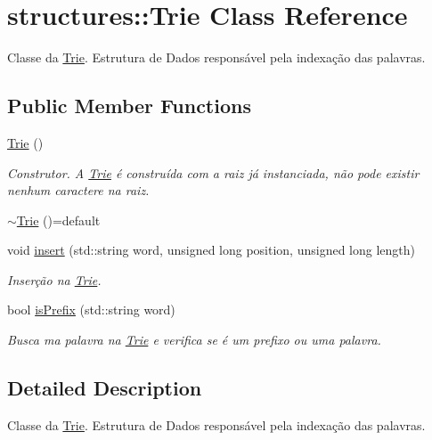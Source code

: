 \hypertarget{classstructures_1_1Trie}{}\section{structures\+:\+:Trie Class Reference}
\label{classstructures_1_1Trie}


Classe da \hyperlink{classstructures_1_1Trie}{Trie}. Estrutura de Dados responsável pela indexação das palavras.  


\subsection*{Public Member Functions}
\begin{DoxyCompactItemize}
\item 
\mbox{\label{classstructures_1_1Trie_af6cf71564b040dfc62bbdedbbab8271a}} 
\hyperlink{classstructures_1_1Trie_af6cf71564b040dfc62bbdedbbab8271a}{Trie} ()
\begin{DoxyCompactList}\small\item\em Construtor. A \hyperlink{classstructures_1_1Trie}{Trie} é construída com a raiz já instanciada, não pode existir nenhum caractere na raiz. \end{DoxyCompactList}\item 
\hyperlink{classstructures_1_1Trie_a02b9941c124c9c6ab85eff56bef7cf77}{$\sim$\+Trie} ()=default
\item 
void \hyperlink{classstructures_1_1Trie_a70ff5a7364c0bb15028578596514cea4}{insert} (std\+::string word, unsigned long position, unsigned long length)
\begin{DoxyCompactList}\small\item\em Inserção na \hyperlink{classstructures_1_1Trie}{Trie}. \end{DoxyCompactList}\item 
bool \hyperlink{classstructures_1_1Trie_a9b959bfb880e7a4bb6a7e71540c0c82a}{is\+Prefix} (std\+::string word)
\begin{DoxyCompactList}\small\item\em Busca ma palavra na \hyperlink{classstructures_1_1Trie}{Trie} e verifica se é um prefixo ou uma palavra. \end{DoxyCompactList}\end{DoxyCompactItemize}


\subsection{Detailed Description}
Classe da \hyperlink{classstructures_1_1Trie}{Trie}. Estrutura de Dados responsável pela indexação das palavras. 

